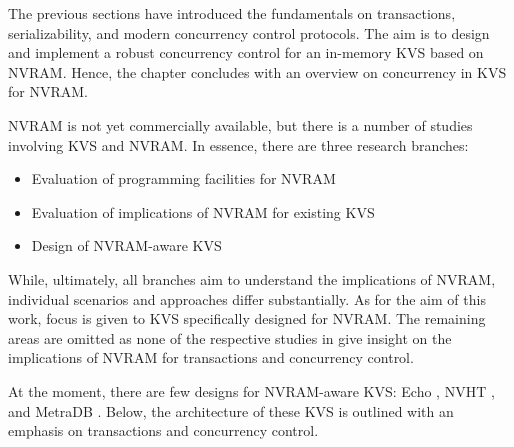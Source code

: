 The previous sections have introduced the fundamentals on transactions,
serializability, and modern concurrency control protocols. The aim is to design
and implement a robust concurrency control for an in-memory \ac{KVS} based on
\ac{NVRAM}. Hence, the chapter concludes with an overview on concurrency in
\ac{KVS} for \ac{NVRAM}.

\ac{NVRAM} is not yet commercially available, but there is a number of studies
involving \ac{KVS} and \ac{NVRAM}. In essence, there are three research
branches:

\begin{itemize}
    \item Evaluation of programming facilities for \ac{NVRAM}
    \item Evaluation of implications of \ac{NVRAM} for existing \ac{KVS}
    \item Design of \ac{NVRAM}-aware \ac{KVS}
\end{itemize}

While, ultimately, all branches aim to understand the implications of
\ac{NVRAM}, individual scenarios and approaches differ substantially. As for the
aim of this work, focus is given to \ac{KVS} specifically designed for
\ac{NVRAM}. The remaining areas are omitted as none of the respective studies in
\cite{venkataraman2011consistent, pelley2013storage, volos2014aerie,
lersch2017analysis, malinowski2017using} give insight on the implications of
\ac{NVRAM} for transactions and concurrency control.


At the moment, there are few designs for \ac{NVRAM}-aware \ac{KVS}: Echo
\cite{bailey2013exploring}, NVHT \cite{zhou2016nvht}, and MetraDB
\cite{marmol2016nonvolatile}. Below, the architecture of these \ac{KVS} is outlined
with an emphasis on transactions and concurrency control.

